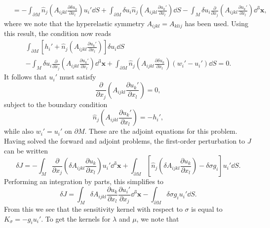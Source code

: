 \documentclass[a4paper,10pt]{paper}
\begin{document}
\begin{enumerate}
\begin{align*}
    &=-\int_{\partial M}\hat{n}_{j}\left(A_{ijkl}\frac{\partial\delta u_{k}}{\partial x_{l}}\right)u_{i}'\dd S+\int_{\partial M}\delta u_{i}\hat{n}_{j}\left(A_{ijkl}\frac{\partial u_{k}'}{\partial x_{l}}\right)\dd S -\int_{M}\delta u_{i}\frac{\partial}{\partial x_{j}}\left(A_{ijkl}\frac{\partial u_{k}'}{\partial x_{l}}\right)\dd^{3}\mathbf{x},
\end{align*}
where we note that the hyperelastic symmetry $A_{ijkl}=A_{klij}$ has been used. Using this result, the condition now reads
\begin{multline*}
    \int_{\partial M}[h_{i}'+\hat{n}_{j}\left(A_{ijkl}\frac{\partial u_{k}'}{\partial x_{l}}\right)]\delta u_{i}\dd S \\
    -\int_{M}\delta u_{i}\frac{\partial}{\partial x_{j}}\left(A_{ijkl}\frac{\partial u_{k}'}{\partial x_{l}}\right)\dd^{3}\mathbf{x} +\int_{\partial M}\hat{n}_{j}\left(A_{ijkl}\frac{\partial\delta u_{k}}{\partial x_{l}}\right)(w_{i}'-u_{i}')\dd S=0.
\end{multline*}
It follows that $u_{i}'$ must satisfy
\begin{equation*}
    \frac{\partial}{\partial x_{j}}\left(A_{ijkl}\frac{\partial u_{k}'}{\partial x_{l}}\right)=0,
\end{equation*}
subject to the boundary condition
\begin{equation*}
    \hat{n}_{j}\left(A_{ijkl}\frac{\partial u_{k}'}{\partial x_{l}}\right)=-h_{i}',
\end{equation*}
while also $w_{i}'=u_{i}'$ on $\partial M$. These are the adjoint equations for this problem. Having solved the forward and adjoint problems, the first-order perturbation to $J$ can be written
\begin{equation*}
    \delta J = -\int_{M}\frac{\partial}{\partial x_{j}}\left(\delta A_{ijkl}\frac{\partial u_{k}}{\partial x_{l}}\right)u_{i}'\dd^{3}\mathbf{x} + \int_{\partial M}\left[\hat{n}_{j}\left(\delta A_{ijkl}\frac{\partial u_{k}}{\partial x_{l}}\right)-\delta\sigma g_{i}\right]u_{i}'\dd S.
\end{equation*}
Performing an integration by parts, this simplifies to
\begin{equation*}
    \delta J=\int_{M}\delta A_{ijkl}\frac{\partial u_{k}}{\partial x_{l}}\frac{\partial u_{i}'}{\partial x_{j}}\dd^{3}\mathbf{x}-\int_{\partial M}\delta\sigma g_{i}u_{i}'\dd S.
\end{equation*}
From this we see that the sensitivity kernel with respect to $\sigma$ is equal to $K_{\sigma}=-g_{i}u_{i}'$. To get the kernels for $\lambda$ and $\mu$, we note that

\end{enumerate}
\end{document}
